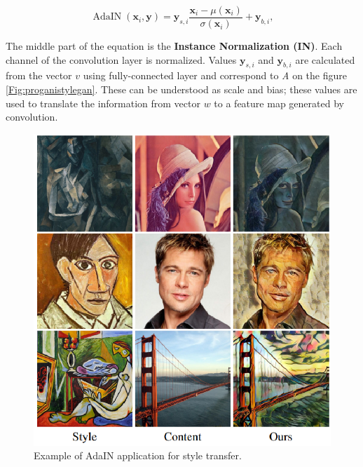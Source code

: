 \documentclass[12pt,a4paper,openany]{book}
\begin{document}
\begin{equation}
\operatorname{AdaIN}\left(\mathbf{x}_{i}, \mathbf{y}\right)=\mathbf{y}_{s, i} \frac{\mathbf{x}_{i}-\mu\left(\mathbf{x}_{i}\right)}{\sigma\left(\mathbf{x}_{i}\right)}+\mathbf{y}_{b, i},
\end{equation}


\noindent The middle part of the equation is the \textbf{Instance Normalization (IN)}. Each channel of the convolution layer is normalized. Values $\textbf{y}_{s,i}$ and $\textbf{y}_{b,i}$ are calculated from the vector $v$ using fully-connected layer and correspond to \textit{A} on the figure \ref{Fig:proganistylegan}. These can be understood as scale and bias; these values are used to translate the information from vector $w$ to a feature map generated by convolution.

\begin{figure}[ht!]
    \centering
    \includegraphics[scale=1.0]{figs/adaptive-instance-norm.eps}
    \caption{Example of AdaIN application for style transfer. \cite{adain}}\label{Fig:STYLEGAN}
\end{figure}
\end{document}
